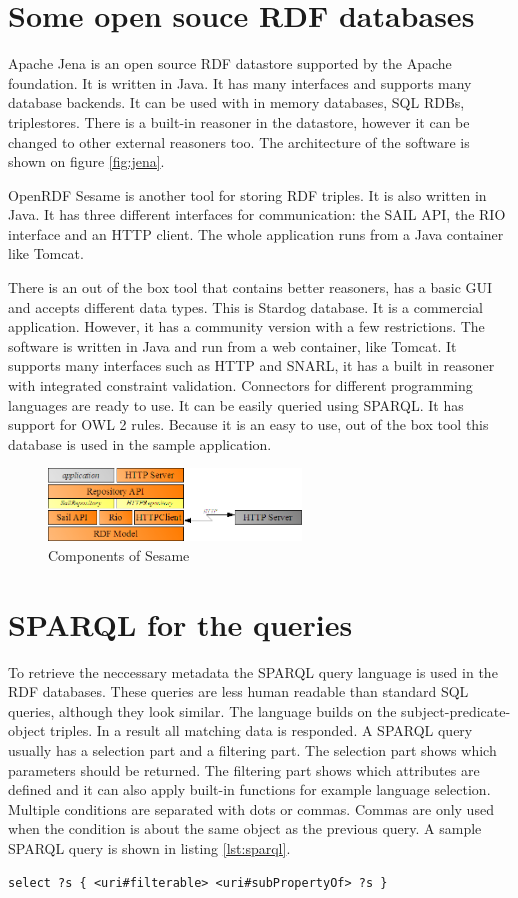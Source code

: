 \section{Some open souce RDF databases} 


Apache Jena is an open source RDF datastore supported by the Apache foundation. It is written in Java\cite{jena}. It has many interfaces and supports many database backends. It can be used with in memory databases, SQL RDBs, triplestores. There is a built-in reasoner in the datastore, however it can be changed to other external reasoners too. The architecture of the software is shown on figure \ref{fig:jena}.

OpenRDF Sesame is another tool for storing RDF triples. It is also written in Java. It has three different interfaces for communication: the SAIL API, the RIO interface and an HTTP client. The whole application runs from a Java container like Tomcat.

There is an out of the box tool that contains better reasoners, has a basic GUI and accepts different data types. This is Stardog database. It is a commercial application. However, it has a community version with a few restrictions. The software is written in Java and run from a web container, like Tomcat. It supports many interfaces such as HTTP and SNARL, it has a built in reasoner with integrated constraint validation. Connectors for different programming languages are ready to use. It can be easily queried using SPARQL. It has support for OWL 2 rules. Because it is an easy to use, out of the box tool this database  is used in the sample application.

\begin{figure}[h]
\centering
\includegraphics[width=0.6\textwidth]{figures/sesame-components.png}
\caption{Components of Sesame\label{fig:sesame}}
\end{figure}

\section{SPARQL for the queries}

To retrieve the neccessary metadata the SPARQL query language is used in the RDF databases. These queries are less human readable than standard SQL queries, although they look similar. The language builds on the subject-predicate-object triples. In a result all matching data is responded. A SPARQL query usually has a selection part and a filtering part. The selection part shows which parameters should be returned. The filtering part shows which attributes are defined and it can also apply built-in functions for example language selection. Multiple conditions are separated with dots or commas. Commas are only used when the condition is about the same object as the previous query.  A sample SPARQL query is shown in listing \ref{lst:sparql}.

\begin{lstlisting}[caption={Sample SPARQL that queries all filterable objects\label{lst:sparql}}]
select ?s { <uri#filterable> <uri#subPropertyOf> ?s }
\end{lstlisting}
